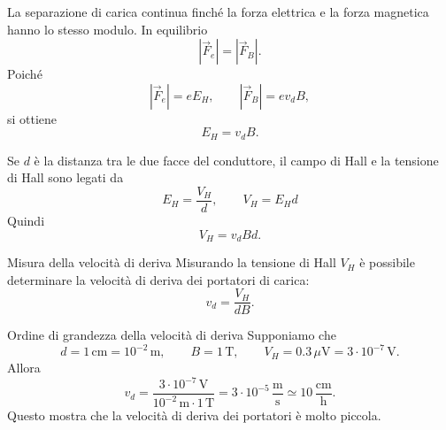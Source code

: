 \documentclass[a4paper]{article}
\begin{document}
\begin{center}
\end{center}

La separazione di carica continua finché la forza elettrica e la forza magnetica hanno lo stesso modulo. In equilibrio
\[
    \left|\vec{F}_e\right|=\left|\vec{F}_B\right|.
\]
Poiché
\[
    \left|\vec{F}_e\right|=eE_H,
    \qquad
    \left|\vec{F}_B\right|=ev_dB,
\]
si ottiene
\[
    E_H = v_dB.
\]

Se \(d\) è la distanza tra le due facce del conduttore, il campo di Hall e la tensione di Hall sono legati da
\[
    E_H = \frac{V_H}{d},
    \qquad
    V_H=E_Hd
\]
Quindi
\[
    V_H = v_dBd.
\]

\begin{snippetproposition}{Misura della velocità di deriva}
    Misurando la tensione di Hall \(V_H\) è possibile determinare la velocità di deriva dei portatori di carica:
    \[
        v_d = \frac{V_H}{dB}.
    \]
\end{snippetproposition}

\begin{snippetexample}{Ordine di grandezza della velocità di deriva}
    Supponiamo che
    \[
        d=1\,\mathrm{cm}=10^{-2}\,\mathrm{m},
        \qquad
        B=1\,\mathrm{T},
        \qquad
        V_H=0.3\,\mu\mathrm{V}=3\cdot 10^{-7}\,\mathrm{V}.
    \]
    Allora
    \[
        v_d = \frac{3\cdot 10^{-7}\,\mathrm{V}}{10^{-2}\,\mathrm{m}\cdot 1\,\mathrm{T}}
        = 3\cdot 10^{-5}\,\frac{\mathrm{m}}{\mathrm{s}}
        \simeq 10\,\frac{\mathrm{cm}}{\mathrm{h}}.
    \]
    Questo mostra che la velocità di deriva dei portatori è molto piccola.
\end{snippetexample}
\end{document}
